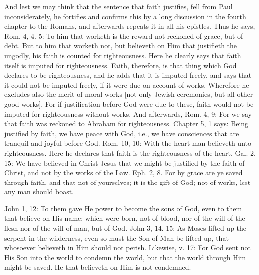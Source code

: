 And lest we may think that the sentence that faith justifies, fell
from Paul inconsiderately, he fortifies and confirms this by a long
discussion in the fourth chapter to the Romans, and afterwards
repeats it in all his epistles.  Thus he says, Rom. 4, 4. 5: To him
that worketh is the reward not reckoned of grace, but of debt.  But
to him that worketh not, but believeth on Him that justifieth the
ungodly, his faith is counted for righteousness.  Here he clearly
says that faith itself is imputed for righteousness.  Faith,
therefore, is that thing which God declares to be righteousness, and
he adds that it is imputed freely, and says that it could not be
imputed freely, if it were due on account of works.  Wherefore he
excludes also the merit of moral works [not only Jewish ceremonies,
but all other good works].  For if justification before God were due
to these, faith would not be imputed for righteousness without works.
And afterwards, Rom. 4, 9: For we say that faith was reckoned to
Abraham for righteousness.  Chapter 5, 1 says: Being justified by
faith, we have peace with God, i.e., we have consciences that are
tranquil and joyful before God.  Rom. 10, 10: With the heart man
believeth unto righteousness.  Here he declares that faith is the
righteousness of the heart.  Gal. 2, 15: We have believed in Christ
Jesus that we might be justified by the faith of Christ, and not by
the works of the Law.  Eph. 2, 8. For by grace are ye saved through
faith, and that not of yourselves; it is the gift of God; not of
works, lest any man should boast.

John 1, 12: To them gave He power to become the sons of God, even to
them that believe on His name; which were born, not of blood, nor of
the will of the flesh nor of the will of man, but of God.  John 3, 14.
15: As Moses lifted up the serpent in the wilderness, even so must
the Son of Man be lifted up, that whosoever believeth in Him should
not perish.  Likewise, v. 17: For God sent not His Son into the world
to condemn the world, but that the world through Him might be saved.
He that believeth on Him is not condemned.

